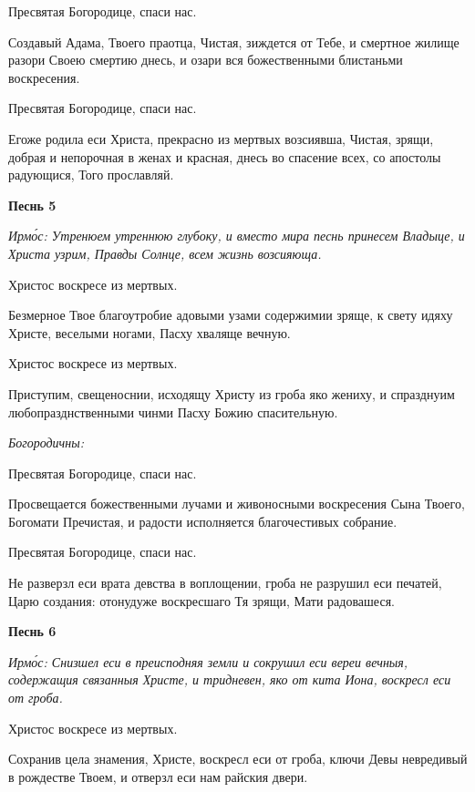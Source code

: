 \normalfont{}


Пресвятая Богородице, спаси нас.


Создавый Адама, Твоего праотца, Чистая, зиждется от Тебе, и смертное жилище разори Своею смертию днесь, и озари вся божественными блистаньми воскресения.


Пресвятая Богородице, спаси нас.


Егоже родила еси Христа, прекрасно из мертвых возсиявша, Чистая, зрящи, добрая и непорочная в женах и красная, днесь во спасение всех, со апостолы радующися, Того прославляй.





\bfseries Песнь 5\normalfont{}


\itshape Ирмо́с:\normalfont{} Утренюем утреннюю глубоку, и вместо мира песнь принесем Владыце, и Христа узрим, Правды Солнце, всем жизнь возсияюща.


Христос воскресе из мертвых.


Безмерное Твое благоутробие адовыми узами содержимии зряще, к свету идяху Христе, веселыми ногами, Пасху хваляще вечную.


Христос воскресе из мертвых.


Приступим, свещеноснии, исходящу Христу из гроба яко жениху, и спразднуим любопразднственными чинми Пасху Божию спасительную.


\itshape Богородичны:

\normalfont{}


Пресвятая Богородице, спаси нас.


Просвещается божественными лучами и живоносными воскресения Сына Твоего, Богомати Пречистая, и радости исполняется благочестивых собрание.


Пресвятая Богородице, спаси нас.


Не разверзл еси врата девства в воплощении, гроба не разрушил еси печатей, Царю создания: отонудуже воскресшаго Тя зрящи, Мати радовашеся.





\bfseries Песнь 6\normalfont{}


\itshape Ирмо́с:\normalfont{} Снизшел еси в преисподняя земли и сокрушил еси вереи вечныя, содержащия связанныя Христе, и тридневен, яко от кита Иона, воскресл еси от гроба.


Христос воскресе из мертвых.


Сохранив цела знамения, Христе, воскресл еси от гроба, ключи Девы невредивый в рождестве Твоем, и отверзл еси нам райския двери.


